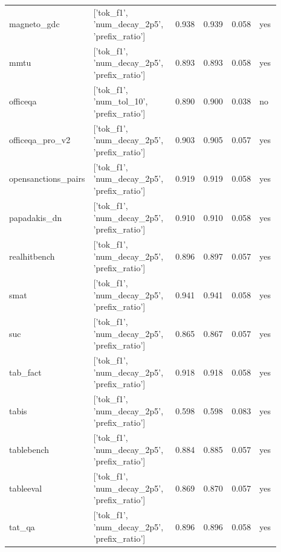 \begin{longtable}{p{0.130\linewidth}p{0.364\linewidth}p{0.110\linewidth}p{0.110\linewidth}p{0.076\linewidth}p{0.096\linewidth}}
magneto\_\allowbreak{}gdc & ['tok\_\allowbreak{}f1', 'num\_\allowbreak{}decay\_\allowbreak{}2p5', 'prefix\_\allowbreak{}ratio'] & 0.938 & 0.939 & 0.058 & yes \\
mmtu & ['tok\_\allowbreak{}f1', 'num\_\allowbreak{}decay\_\allowbreak{}2p5', 'prefix\_\allowbreak{}ratio'] & 0.893 & 0.893 & 0.058 & yes \\
officeqa & ['tok\_\allowbreak{}f1', 'num\_\allowbreak{}tol\_\allowbreak{}10', 'prefix\_\allowbreak{}ratio'] & 0.890 & 0.900 & 0.038 & no \\
officeqa\_\allowbreak{}pro\_\allowbreak{}v2 & ['tok\_\allowbreak{}f1', 'num\_\allowbreak{}decay\_\allowbreak{}2p5', 'prefix\_\allowbreak{}ratio'] & 0.903 & 0.905 & 0.057 & yes \\
opensanctions\_\allowbreak{}pairs & ['tok\_\allowbreak{}f1', 'num\_\allowbreak{}decay\_\allowbreak{}2p5', 'prefix\_\allowbreak{}ratio'] & 0.919 & 0.919 & 0.058 & yes \\
papadakis\_\allowbreak{}dn & ['tok\_\allowbreak{}f1', 'num\_\allowbreak{}decay\_\allowbreak{}2p5', 'prefix\_\allowbreak{}ratio'] & 0.910 & 0.910 & 0.058 & yes \\
realhitbench & ['tok\_\allowbreak{}f1', 'num\_\allowbreak{}decay\_\allowbreak{}2p5', 'prefix\_\allowbreak{}ratio'] & 0.896 & 0.897 & 0.057 & yes \\
smat & ['tok\_\allowbreak{}f1', 'num\_\allowbreak{}decay\_\allowbreak{}2p5', 'prefix\_\allowbreak{}ratio'] & 0.941 & 0.941 & 0.058 & yes \\
suc & ['tok\_\allowbreak{}f1', 'num\_\allowbreak{}decay\_\allowbreak{}2p5', 'prefix\_\allowbreak{}ratio'] & 0.865 & 0.867 & 0.057 & yes \\
tab\_\allowbreak{}fact & ['tok\_\allowbreak{}f1', 'num\_\allowbreak{}decay\_\allowbreak{}2p5', 'prefix\_\allowbreak{}ratio'] & 0.918 & 0.918 & 0.058 & yes \\
tabis & ['tok\_\allowbreak{}f1', 'num\_\allowbreak{}decay\_\allowbreak{}2p5', 'prefix\_\allowbreak{}ratio'] & 0.598 & 0.598 & 0.083 & yes \\
tablebench & ['tok\_\allowbreak{}f1', 'num\_\allowbreak{}decay\_\allowbreak{}2p5', 'prefix\_\allowbreak{}ratio'] & 0.884 & 0.885 & 0.057 & yes \\
tableeval & ['tok\_\allowbreak{}f1', 'num\_\allowbreak{}decay\_\allowbreak{}2p5', 'prefix\_\allowbreak{}ratio'] & 0.869 & 0.870 & 0.057 & yes \\
tat\_\allowbreak{}qa & ['tok\_\allowbreak{}f1', 'num\_\allowbreak{}decay\_\allowbreak{}2p5', 'prefix\_\allowbreak{}ratio'] & 0.896 & 0.896 & 0.058 & yes \\

\end{longtable}
